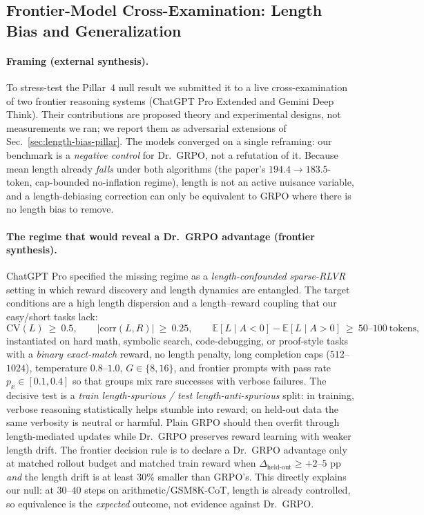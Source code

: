 \documentclass{article}
\begin{document}
\subsection{Frontier-Model Cross-Examination: Length Bias and Generalization}
\label{sec:frontier-length-bias}

\paragraph{Framing (external synthesis).}
To stress-test the Pillar~4 null result we submitted it to a live
cross-examination of two frontier reasoning systems (ChatGPT Pro Extended and
Gemini Deep Think). Their contributions are proposed theory and experimental
designs, not measurements we ran; we report them as adversarial extensions of
Sec.~\ref{sec:length-bias-pillar}. The models converged on a single reframing:
our benchmark is a \emph{negative control} for Dr.~GRPO, not a refutation of it.
Because mean length already \emph{falls} under both algorithms (the paper's
$194.4\!\to\!183.5$-token, cap-bounded no-inflation regime), length is not an
active nuisance variable, and a length-debiasing correction can only be equivalent to GRPO where
there is no length bias to remove.

\paragraph{The regime that would reveal a Dr.~GRPO advantage (frontier synthesis).}
ChatGPT Pro specified the missing regime as a \emph{length-confounded sparse-RLVR}
setting in which reward discovery and length dynamics are entangled. The target
conditions are a high length dispersion and a length--reward coupling that our
easy/short tasks lack:
\begin{equation}
\mathrm{CV}(L)\ \ge\ 0.5, \qquad
\bigl|\mathrm{corr}(L,R)\bigr|\ \ge\ 0.25, \qquad
\mathbb{E}[L \mid A<0] - \mathbb{E}[L \mid A>0]\ \ge\ 50\text{--}100\ \text{tokens},
\end{equation}
instantiated on hard math, symbolic search, code-debugging, or proof-style tasks
with a \emph{binary exact-match} reward, no length penalty, long completion caps
($512$--$1024$), temperature $0.8$--$1.0$, $G\in\{8,16\}$, and frontier prompts
with pass rate $p_x\in[0.1,0.4]$ so that groups mix rare successes with verbose
failures. The decisive test is a \emph{train length-spurious / test
length-anti-spurious} split: in training, verbose reasoning statistically helps
stumble into reward; on held-out data the same verbosity is neutral or harmful.
Plain GRPO should then overfit through length-mediated updates while Dr.~GRPO
preserves reward learning with weaker length drift. The frontier decision rule
is to declare a Dr.~GRPO advantage only at matched rollout budget and matched
train reward when $\Delta_{\text{held-out}}\ge +2$--$5$ pp \emph{and} the length
drift is at least $30\%$ smaller than GRPO's. This directly explains our null:
at $30$--$40$ steps on arithmetic/GSM8K-CoT, length is already controlled, so
equivalence is the \emph{expected} outcome, not evidence against Dr.~GRPO.
\end{document}
